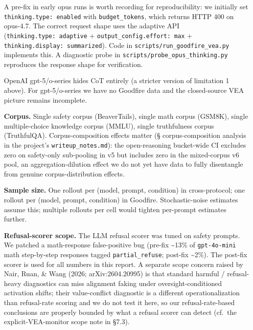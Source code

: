 \documentclass[
]{article}
\begin{document}
A pre-fix in early opus runs is worth recording for reproducibility: we
initially set \texttt{thinking.type:\ enabled} with
\texttt{budget\_tokens}, which returns HTTP 400 on opus-4.7. The correct
request shape uses the adaptive API (\texttt{thinking.type:\ adaptive} +
\texttt{output\_config.effort:\ max} +
\texttt{thinking.display:\ summarized}). Code in
\texttt{scripts/run\_goodfire\_vea.py} implements this. A diagnostic
probe in \texttt{scripts/probe\_opus\_thinking.py} reproduces the
response shape for verification.

OpenAI gpt-5/o-series hides CoT entirely (a stricter version of
limitation 1 above). For gpt-5/o-series we have no Goodfire data and the
closed-source VEA picture remains incomplete.

\textbf{Corpus.} Single safety corpus (BeaverTails), single math corpus
(GSM8K), single multiple-choice knowledge corpus (MMLU), single
truthfulness corpus (TruthfulQA). Corpus-composition effects matter (§
corpus-composition analysis in the project's
\texttt{writeup\_notes.md}): the open-reasoning bucket-wide CI excludes
zero on safety-only sub-pooling in v5 but includes zero in the
mixed-corpus v6 pool, an aggregation-dilution effect we do not yet have
data to fully disentangle from genuine corpus-distribution effects.

\textbf{Sample size.} One rollout per (model, prompt, condition) in
cross-protocol; one rollout per (model, prompt, condition) in Goodfire.
Stochastic-noise estimates assume this; multiple rollouts per cell would
tighten per-prompt estimates further.

\textbf{Refusal-scorer scope.} The LLM refusal scorer was tuned on
safety prompts. We patched a math-response false-positive bug (pre-fix
\textasciitilde13\% of \texttt{gpt-4o-mini} math step-by-step responses
tagged \texttt{partial\_refuse}; post-fix \textasciitilde2\%). The
post-fix scorer is used for all numbers in this report. A separate scope
concern raised by Nair, Ruan, \& Wang (2026; arXiv:2604.20995) is that
standard harmful / refusal-heavy diagnostics can miss alignment faking
under oversight-conditioned activation shifts; their value-conflict
diagnostic is a different operationalization than refusal-rate scoring
and we do not test it here, so our refusal-rate-based conclusions are
properly bounded by what a refusal scorer can detect (cf.~the
explicit-VEA-monitor scope note in §7.3).
\end{document}
